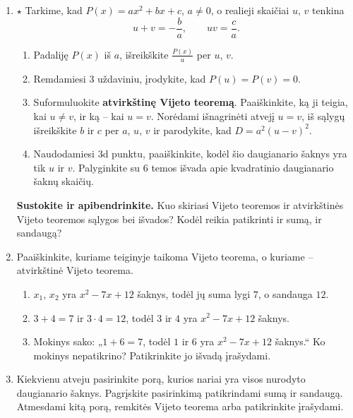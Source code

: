 \documentclass[12pt,a4paper]{article}
\begin{document}
\begin{enumerate}[series=uzdaviniai]
\begin{enumerate}
\item Ką šie skaičiavimai pasako apie $u$, $v$ ir daugianarį $x^2-Sx+T$? Ar samprotavimas tinka, kai $u=v$?
\item Atskliauskite $(x-u)(x-v)$ ir palyginkite rezultatą su $x^2-Sx+T$. Paaiškinkite, kodėl sandauga $(x-u)(x-v)$ lygi $0$ tada ir tik tada, kai bent vienas iš jos dauginamųjų lygus $0$, ir iš to pagrįskite, kad $u$ ir $v$ yra visos šio daugianario šaknys. Ką gaunate, kai $u=v$?
\end{enumerate}
\needspace{7cm}
\item\label{atteorema} $\star$ Tarkime, kad $P(x)=ax^2+bx+c$, $a\ne0$, o realieji skaičiai $u$, $v$ tenkina
\[u+v=-\frac{b}{a},\qquad uv=\frac{c}{a}.\]
\begin{enumerate}
\item Padaliję $P(x)$ iš $a$, išreikškite $\frac{P(x)}{a}$ per $u$, $v$.
\item Remdamiesi 3 uždaviniu, įrodykite, kad $P(u)=P(v)=0$.
\item Suformuluokite \textbf{atvirkštinę Vijeto teoremą}. Paaiškinkite, ką ji teigia, kai $u\ne v$, ir ką – kai $u=v$. Norėdami išnagrinėti atvejį $u=v$, iš sąlygų išreikškite $b$ ir $c$ per $a$, $u$, $v$ ir parodykite, kad $D=a^2(u-v)^2$.
\item Naudodamiesi 3d punktu, paaiškinkite, kodėl šio daugianario šaknys yra tik $u$ ir $v$. Palyginkite su 6 temos išvada apie kvadratinio daugianario šaknų skaičių.
\end{enumerate}
\par\medskip
\textbf{Sustokite ir apibendrinkite.} Kuo skiriasi Vijeto teoremos ir atvirkštinės Vijeto teoremos sąlygos bei išvados? Kodėl reikia patikrinti ir sumą, ir sandaugą?
\item Paaiškinkite, kuriame teiginyje taikoma Vijeto teorema, o kuriame – atvirkštinė Vijeto teorema.
\begin{enumerate}
\item $x_1$, $x_2$ yra $x^2-7x+12$ šaknys, todėl jų suma lygi $7$, o sandauga $12$.
\item $3+4=7$ ir $3\cdot4=12$, todėl $3$ ir $4$ yra $x^2-7x+12$ šaknys.
\item Mokinys sako: „$1+6=7$, todėl $1$ ir $6$ yra $x^2-7x+12$ šaknys.“ Ko mokinys nepatikrino? Patikrinkite jo išvadą įrašydami.
\end{enumerate}
\item Kiekvienu atveju pasirinkite porą, kurios nariai yra visos nurodyto daugianario šaknys. Pagrįskite pasirinkimą patikrindami sumą ir sandaugą. Atmesdami kitą porą, remkitės Vijeto teorema arba patikrinkite įrašydami.

\end{enumerate}
\end{document}
